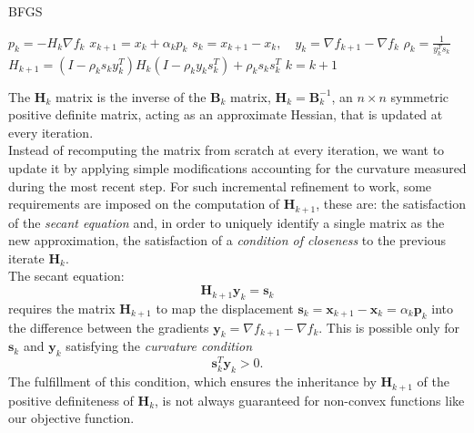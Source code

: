 \documentclass{article}
\numberwithin{equation}{section}
\begin{document}
\begin{algorithm}
\caption{BFGS}\label{alg:cap}
\begin{algorithmic}

        \State $p_k= - H_k \nabla f_k$ 
        \State $x_{k+1}=x_k + \alpha_k p_k$ 
        \State $s_k = x_{k+1} - x_k, \quad y_k = \nabla f_{k+1} - \nabla f_k$
        \State $\rho_k = \frac{1}{y_k^T s_k}$
        \State $H_{k+1} = (I - \rho_k s_k y^T_k) H_k (I - \rho_k y_k s^T_k ) + \rho_k s_k s^T_k$
        \State $ k = k + 1$
    \EndWhile
\EndProcedure
\end{algorithmic}
\end{algorithm}

The $\boldsymbol{H}_k$ matrix is the inverse of the $\boldsymbol{B}_k$ matrix, $\boldsymbol{H}_k=\boldsymbol{B}^{-1}_k$, an $n \times n$ symmetric positive definite matrix, acting as an approximate Hessian, that is updated at every iteration.
\\

Instead of recomputing the  matrix from scratch at every iteration, we want to update it by applying simple modifications accounting for the curvature measured during the most recent step. For such incremental refinement to work, some requirements are imposed on the computation of $\boldsymbol{H}_{k+1}$, these are: the satisfaction of the \textit{secant equation} and, in order to uniquely identify a single matrix as the new approximation, the satisfaction of a \textit{condition of closeness} to the previous iterate $\boldsymbol{H}_k$.
\\

The secant equation:
\begin{equation*}
   \boldsymbol{H}_{k+1}\boldsymbol{y}_k = \boldsymbol{s}_k
\end{equation*}
requires the matrix $\boldsymbol{H}_{k+1}$ to map the displacement $\boldsymbol{s}_k = \boldsymbol{x}_{k+1} - \boldsymbol{x}_k = \alpha_k \boldsymbol{p}_k$ into the difference between the gradients $\boldsymbol{y}_k = \nabla f_{k+1} - \nabla f_k$. This is possible only for $\boldsymbol{s}_k$ and $\boldsymbol{y}_k$ satisfying the \textit{curvature condition}
\begin{equation*}
   \boldsymbol{s}_k^T \boldsymbol{y}_k > 0. 
\end{equation*}
The fulfillment of this condition, which ensures the inheritance by $\boldsymbol{H}_{k+1}$ of the positive definiteness of $\boldsymbol{H}_k$, is not always guaranteed for non-convex functions like our objective function.\\
\end{document}
